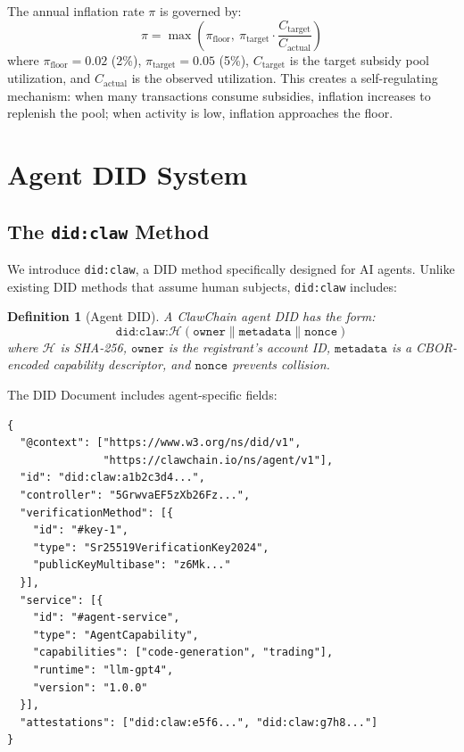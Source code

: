 \documentclass[conference]{IEEEtran}
\newtheorem{definition}{Definition}
\begin{document}
The annual inflation rate $\pi$ is governed by:
\begin{equation}
    \pi = \max\left(\pi_{\text{floor}},\ \pi_{\text{target}} \cdot \frac{C_{\text{target}}}{C_{\text{actual}}}\right)
\end{equation}
where $\pi_{\text{floor}} = 0.02$ (2\%), $\pi_{\text{target}} = 0.05$ (5\%), $C_{\text{target}}$ is the target subsidy pool utilization, and $C_{\text{actual}}$ is the observed utilization. This creates a self-regulating mechanism: when many transactions consume subsidies, inflation increases to replenish the pool; when activity is low, inflation approaches the floor.


\section{Agent DID System}\label{sec:did}

\subsection{The \texttt{did:claw} Method}

We introduce \texttt{did:claw}, a DID method specifically designed for AI agents. Unlike existing DID methods that assume human subjects, \texttt{did:claw} includes:

\begin{definition}[Agent DID]
A ClawChain agent DID has the form:
\begin{equation}
    \texttt{did:claw:}\mathcal{H}(\texttt{owner} \| \texttt{metadata} \| \texttt{nonce})
\end{equation}
where $\mathcal{H}$ is SHA-256, $\texttt{owner}$ is the registrant's account ID, $\texttt{metadata}$ is a CBOR-encoded capability descriptor, and $\texttt{nonce}$ prevents collision.
\end{definition}

The DID Document includes agent-specific fields:

\begin{lstlisting}[basicstyle=\ttfamily\scriptsize, frame=single, xleftmargin=1em]
{
  "@context": ["https://www.w3.org/ns/did/v1",
               "https://clawchain.io/ns/agent/v1"],
  "id": "did:claw:a1b2c3d4...",
  "controller": "5GrwvaEF5zXb26Fz...",
  "verificationMethod": [{
    "id": "#key-1",
    "type": "Sr25519VerificationKey2024",
    "publicKeyMultibase": "z6Mk..."
  }],
  "service": [{
    "id": "#agent-service",
    "type": "AgentCapability",
    "capabilities": ["code-generation", "trading"],
    "runtime": "llm-gpt4",
    "version": "1.0.0"
  }],
  "attestations": ["did:claw:e5f6...", "did:claw:g7h8..."]
}
\end{lstlisting}
\end{document}

